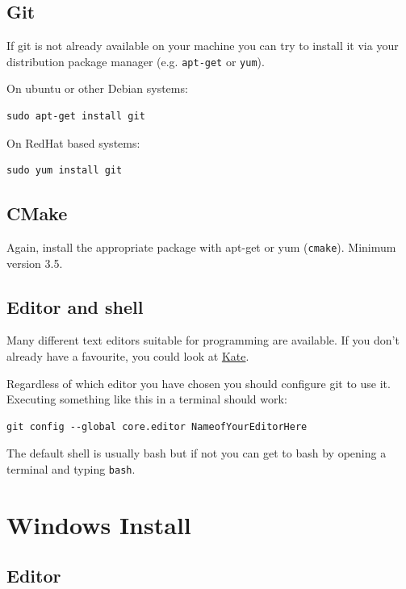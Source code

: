 \subsection{Git}\label{git-1}

If git is not already available on your machine you can try to install
it via your distribution package manager (e.g. \texttt{apt-get} or
\texttt{yum}).

On ubuntu or other Debian systems:

\begin{verbatim}
sudo apt-get install git
\end{verbatim}

On RedHat based systems:

\begin{verbatim}
sudo yum install git
\end{verbatim}

\subsection{CMake}\label{cmake-1}

Again, install the appropriate package with apt-get or yum
(\texttt{cmake}). Minimum version 3.5.

\subsection{Editor and shell}\label{editor-and-shell}

Many different text editors suitable for programming are available. If
you don't already have a favourite, you could look at
\href{http://kate-editor.org/}{Kate}.

Regardless of which editor you have chosen you should configure git to
use it. Executing something like this in a terminal should work:

\begin{verbatim}
git config --global core.editor NameofYourEditorHere
\end{verbatim}

The default shell is usually bash but if not you can get to bash by
opening a terminal and typing \texttt{bash}.

\section{Windows Install}\label{windows-install}

\subsection{Editor}\label{editor}

